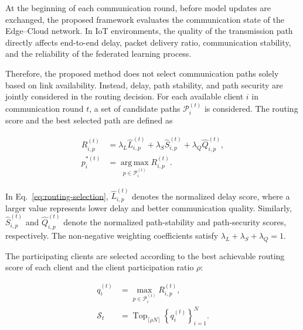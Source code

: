 \documentclass[5p,times,numafflabel]{elsarticle}
\begin{document}
	At the beginning of each communication round, before model updates
	are exchanged, the proposed framework evaluates the communication
	state of the Edge--Cloud network. In IoT environments, the quality of
	the transmission path directly affects end-to-end delay, packet
	delivery ratio, communication stability, and the reliability of the
	federated learning process.
	
	Therefore, the proposed method does not select communication paths
	solely based on link availability. Instead, delay, path stability,
	and path security are jointly considered in the routing decision.
	For each available client \(i\) in communication round \(t\), a set
	of candidate paths \(\mathcal{P}_{i}^{(t)}\) is considered. The
	routing score and the best selected path are defined as
	
	\begin{equation}
		\begin{aligned}
			R_{i,p}^{(t)}
			&=
			\lambda_{L}\widehat{L}_{i,p}^{(t)}
			+
			\lambda_{S}\widehat{S}_{i,p}^{(t)}
			+
			\lambda_{Q}\widehat{Q}_{i,p}^{(t)},\\
			p_{i}^{*(t)}
			&=
			\operatorname*{arg\,max}_{p\in\mathcal{P}_{i}^{(t)}}
			R_{i,p}^{(t)}.
		\end{aligned}
		\label{eq:routing-selection}
	\end{equation}
	
	In Eq.~\eqref{eq:routing-selection},
	\(\widehat{L}_{i,p}^{(t)}\) denotes the normalized delay score,
	where a larger value represents lower delay and better communication
	quality. Similarly, \(\widehat{S}_{i,p}^{(t)}\) and
	\(\widehat{Q}_{i,p}^{(t)}\) denote the normalized path-stability and
	path-security scores, respectively. The non-negative weighting
	coefficients satisfy
	\(\lambda_{L}+\lambda_{S}+\lambda_{Q}=1\).
	
The participating clients are selected according to the best
achievable routing score of each client and the client participation ratio
\(\rho\):
	
	\begin{equation}
		\begin{aligned}
			q_{i}^{(t)}
			&=
			\max_{p\in\mathcal{P}_{i}^{(t)}}
			R_{i,p}^{(t)},\\
			\mathcal{S}_{t}
			&=
			\operatorname{Top}_{\lceil\rho N\rceil}
			\left\{
			q_{i}^{(t)}
			\right\}_{i=1}^{N}.
		\end{aligned}
		\label{eq:client-selection}
	\end{equation}
	
\end{document}
